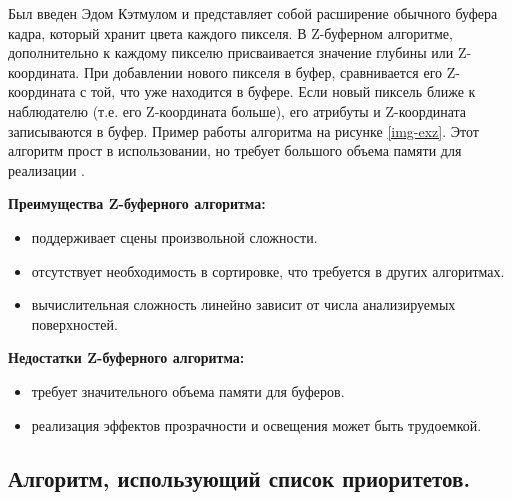 Был введен Эдом Кэтмулом и представляет собой расширение обычного буфера кадра, который хранит цвета каждого пикселя. В Z-буферном алгоритме, дополнительно к каждому пикселю присваивается значение глубины или Z-координата. При добавлении нового пикселя в буфер, сравнивается его Z-координата с той, что уже находится в буфере. Если новый пиксель ближе к наблюдателю (т.е. его Z-координата больше), его атрибуты и Z-координата записываются в буфер. Пример работы алгоритма на рисунке \ref{img-exz}. Этот алгоритм прост в использовании, но требует большого объема памяти для реализации \cite{del_line}. 


\textbf{Преимущества Z-буферного алгоритма:}
\begin{itemize}
\item поддерживает сцены произвольной сложности.
\item отсутствует необходимость в сортировке, что требуется в других алгоритмах.
\item вычислительная сложность линейно зависит от числа анализируемых поверхностей.
\end{itemize}

\textbf{Недостатки Z-буферного алгоритма:}
\begin{itemize}
\item требует значительного объема памяти для буферов.
\item реализация эффектов прозрачности и освещения может быть трудоемкой.
\end{itemize}




\subsection{Алгоритм, использующий список приоритетов.}

